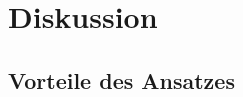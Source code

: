 \chapter{Diskussion}
\label{ch:diskussion}


\section{Vorteile des Ansatzes}
\label{sec:VorteiledesAnsatzes}


